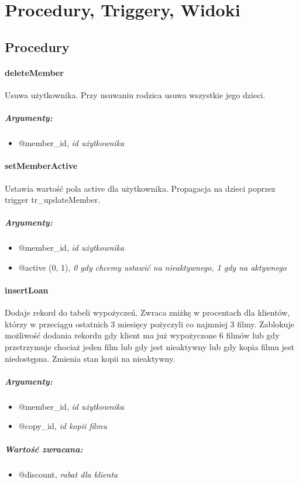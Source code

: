 \documentclass[12pt,a4paper,titlepage]{article}
\begin{document}

\newpage
\section{Procedury, Triggery, Widoki}


\subsection{Procedury}
\paragraph{deleteMember}
Usuwa użytkownika. Przy usuwaniu rodzica usuwa wszystkie jego dzieci.
\subparagraph{Argumenty:}
\begin{itemize}
	\item @member\_id, \textit{id użytkownika}
\end{itemize}

\paragraph{setMemberActive}
Ustawia wartość pola active dla użytkownika. Propagacja na dzieci poprzez trigger tr\_updateMember.
\subparagraph{Argumenty:}
\begin{itemize}
	\item @member\_id, \textit{id użytkownika}
	\item @active (0, 1), \textit{0 gdy chcemy ustawić na nieaktywnego, 1 gdy na aktywnego}
\end{itemize}

\paragraph{insertLoan}
Dodaje rekord do tabeli wypożyczeń. Zwraca zniżkę w procentach dla klientów, którzy w przeciągu ostatnich 3 miesięcy pożyczyli co najmniej 3 filmy.
Zablokuje możliwość dodania rekordu gdy klient ma już wypożyczone 6 filmów lub gdy przetrzymuje chociaż jeden film lub gdy jest nieaktywny lub gdy kopia filmu jest niedostępna.
Zmienia stan kopii na nieaktywny.
\subparagraph{Argumenty:}
\begin{itemize}
	\item @member\_id, \textit{id użytkownika}
	\item @copy\_id, \textit{id kopii filmu}
\end{itemize}
\subparagraph{Wartość zwracana:}
\begin{itemize}
	\item @discount, \textit{rabat dla klienta}
\end{itemize}
\newpage
\end{document}
